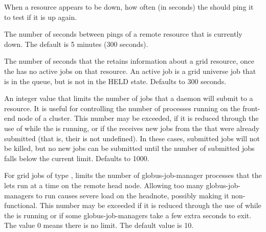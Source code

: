 \begin{description}
\label{param:GridmanagerResourceProbeInterval}
\item[\Macro{GRIDMANAGER\_RESOURCE\_PROBE\_INTERVAL}]
  When a resource appears to be down, how often (in seconds) the
  should ping it to test if it is up again.

\label{param:GridmanagerResourceProbeDelay}
\item[\Macro{GRIDMANAGER\_RESOURCE\_PROBE\_DELAY}]
  The number of seconds
  between pings of a remote resource that is currently down.
  The default is 5 minutes (300 seconds).

\label{param:GridmanagerEmptyResourceDelay}
\item[\Macro{GRIDMANAGER\_EMPTY\_RESOURCE\_DELAY}]
  The number of seconds
  that the  retains information about a grid
  resource, once the  has no active jobs
  on that resource.
  An active job is a grid universe job that is in the queue,
  but is not in the HELD state.
  Defaults to 300 seconds.

\label{param:GridmanagerMaxSubmittedJobsPerResource}
\item[\Macro{GRIDMANAGER\_MAX\_SUBMITTED\_JOBS\_PER\_RESOURCE}]
  An integer value that limits the number of jobs
  that a  daemon will submit to a resource.
  It is useful for controlling the number of 
  processes running on the front-end node of a cluster.
  This number may be exceeded, if it is reduced through the use
  of  while the  is running,
  or if the  receives new
  jobs from the  that were already submitted
  (that is, their  is not undefined).
  In these cases, submitted jobs will not be killed,
  but no new jobs can be submitted until the number of submitted
  jobs falls below the current limit.
  Defaults to 1000.

\label{param:GridmanagerMaxJobmanagersPerResource}
\item[\Macro{GRIDMANAGER\_MAX\_JOBMANAGERS\_PER\_RESOURCE}]
  For grid jobs of type , limits the number of globus-job-manager
  processes that the  lets run at a time on
  the remote head node. Allowing too many globus-job-managers to run
  causes severe load on the headnote, possibly making it
  non-functional.
  This number may be exceeded if it is reduced through the use
  of  while the  is running
  or if some globus-job-managers take a few extra seconds to exit.
  The value 0 means there is no limit. The default value is 10.


\end{description}
